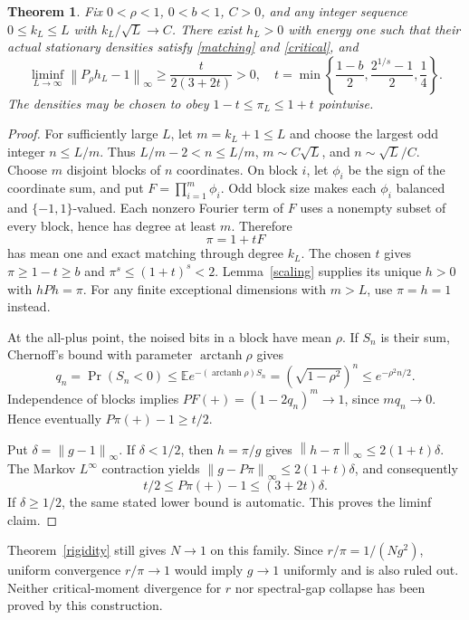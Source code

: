 \documentclass[11pt]{article}
\newtheorem{theorem}{Theorem}
\newcommand{\E}{\mathbb E}
\newcommand{\norm}[1]{\left\|#1\right\|}
\begin{document}
\begin{theorem}\label{supfailure}
Fix $0<\rho<1$, $0<b<1$, $C>0$, and any integer sequence $0\leq k_L\leq L$ with $k_L/\sqrt L\to C$. There exist $h_L>0$ with energy one such that their actual stationary densities satisfy \eqref{matching} and \eqref{critical}, and
\[
 \liminf_{L\to\infty}\norm{P_\rho h_L-1}_\infty
 \geq\frac{t}{2(3+2t)}>0,
\quad
 t=\min\left\{\frac{1-b}{2},\frac{2^{1/s}-1}{2},\frac14\right\}.
\]
The densities may be chosen to obey $1-t\leq\pi_L\leq1+t$ pointwise.
\end{theorem}
\begin{proof}
For sufficiently large $L$, let $m=k_L+1\leq L$ and choose the largest odd integer $n\leq L/m$. Thus $L/m-2<n\leq L/m$, $m\sim C\sqrt L$, and $n\sim\sqrt L/C$. Choose $m$ disjoint blocks of $n$ coordinates. On block $i$, let $\phi_i$ be the sign of the coordinate sum, and put $F=\prod_{i=1}^m\phi_i$. Odd block size makes each $\phi_i$ balanced and $\{-1,1\}$-valued. Each nonzero Fourier term of $F$ uses a nonempty subset of every block, hence has degree at least $m$. Therefore
\[
 \pi=1+tF
\]
has mean one and exact matching through degree $k_L$. The chosen $t$ gives $\pi\geq1-t\geq b$ and $\pi^s\leq(1+t)^s<2$. Lemma~\ref{scaling} supplies its unique $h>0$ with $hPh=\pi$. For any finite exceptional dimensions with $m>L$, use $\pi=h=1$ instead.

At the all-plus point, the noised bits in a block have mean $\rho$. If $S_n$ is their sum, Chernoff's bound with parameter $\operatorname{arctanh}\rho$ gives
\[
 q_n=\Pr(S_n<0)\leq\E e^{-(\operatorname{arctanh}\rho)S_n}
 =(\sqrt{1-\rho^2})^n\leq e^{-\rho^2n/2}.
\]
Independence of blocks implies $PF(+)=(1-2q_n)^m\to1$, since $mq_n\to0$. Hence eventually $P\pi(+)-1\geq t/2$.

Put $\delta=\norm{g-1}_\infty$. If $\delta<1/2$, then $h=\pi/g$ gives $\norm{h-\pi}_\infty\leq2(1+t)\delta$. The Markov $L^\infty$ contraction yields $\norm{g-P\pi}_\infty\leq2(1+t)\delta$, and consequently
\[
 t/2\leq P\pi(+)-1\leq(3+2t)\delta.
\]
If $\delta\geq1/2$, the same stated lower bound is automatic. This proves the liminf claim.
\end{proof}
Theorem~\ref{rigidity} still gives $N\to1$ on this family. Since $r/\pi=1/(Ng^2)$, uniform convergence $r/\pi\to1$ would imply $g\to1$ uniformly and is also ruled out. Neither critical-moment divergence for $r$ nor spectral-gap collapse has been proved by this construction.
\end{document}
